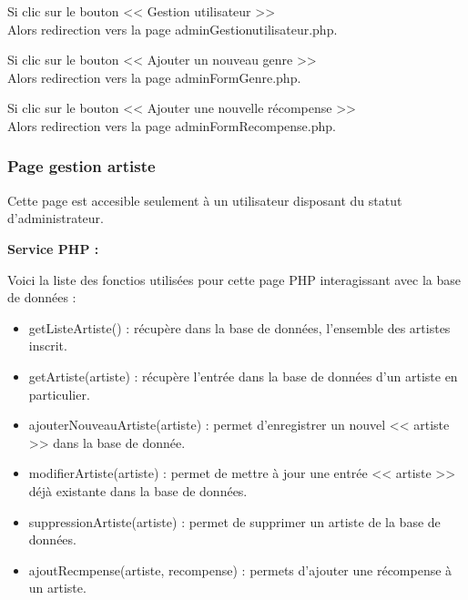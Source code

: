 			\begin{paragraphe}
				Si clic sur le bouton << Gestion utilisateur >> \\
				Alors redirection vers la page adminGestionutilisateur.php.
			\end{paragraphe}

			\begin{paragraphe}
				Si clic sur le bouton << Ajouter un nouveau genre >> \\
				Alors redirection vers la page adminFormGenre.php.
			\end{paragraphe}

			\begin{paragraphe}
				Si clic sur le bouton << Ajouter une nouvelle récompense >> \\
				Alors redirection vers la page adminFormRecompense.php.
			\end{paragraphe}

		\subsubsection{Page gestion artiste}

			\begin{paragraphe}
				Cette page est accesible seulement à un utilisateur disposant du statut d'administrateur.
			\end{paragraphe}

			\begin{paragraphe}
				\textbf{Service PHP :}
			\end{paragraphe}

			\begin{paragraphe}
				Voici la liste des fonctios utilisées pour cette page PHP interagissant avec la base de données :
			\end{paragraphe}

			\begin{paragraphe}
				\begin{itemize}
					\item getListeArtiste() : récupère dans la base de données, l'ensemble des artistes inscrit.
					\item getArtiste(artiste) : récupère l'entrée dans la base de données d'un artiste en particulier.
				\end{itemize}
			\end{paragraphe}

			\begin{paragraphe}
				\begin{itemize}
					\item ajouterNouveauArtiste(artiste) : permet d'enregistrer un nouvel << artiste >> dans la base de donnée.
					\item modifierArtiste(artiste) : permet de mettre à jour une entrée << artiste >> déjà existante dans la base de données.
					\item suppressionArtiste(artiste) : permet de supprimer un artiste de la base de données.
					\item ajoutRecmpense(artiste, recompense) : permets d'ajouter une récompense à un artiste.
				\end{itemize}
			\end{paragraphe}

